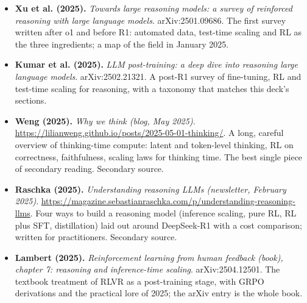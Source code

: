 \begin{itemize}[leftmargin=1.2em,itemsep=3pt]
\item \textbf{Xu et al. (2025).} \textit{Towards large reasoning models: a survey of reinforced reasoning with large language models}. arXiv:2501.09686. The first survey written after o1 and before R1: automated data, test-time scaling and RL as the three ingredients; a map of the field in January 2025.
\item \textbf{Kumar et al. (2025).} \textit{LLM post-training: a deep dive into reasoning large language models}. arXiv:2502.21321. A post-R1 survey of fine-tuning, RL and test-time scaling for reasoning, with a taxonomy that matches this deck's sections.
\item \textbf{Weng (2025).} \textit{Why we think (blog, May 2025)}. \url{https://lilianweng.github.io/posts/2025-05-01-thinking/}. A long, careful overview of thinking-time compute: latent and token-level thinking, RL on correctness, faithfulness, scaling laws for thinking time. The best single piece of secondary reading. Secondary source.
\item \textbf{Raschka (2025).} \textit{Understanding reasoning LLMs (newsletter, February 2025)}. \url{https://magazine.sebastianraschka.com/p/understanding-reasoning-llms}. Four ways to build a reasoning model (inference scaling, pure RL, RL plus SFT, distillation) laid out around DeepSeek-R1 with a cost comparison; written for practitioners. Secondary source.
\item \textbf{Lambert (2025).} \textit{Reinforcement learning from human feedback (book), chapter 7: reasoning and inference-time scaling}. arXiv:2504.12501. The textbook treatment of RLVR as a post-training stage, with GRPO derivations and the practical lore of 2025; the arXiv entry is the whole book.
\end{itemize}
